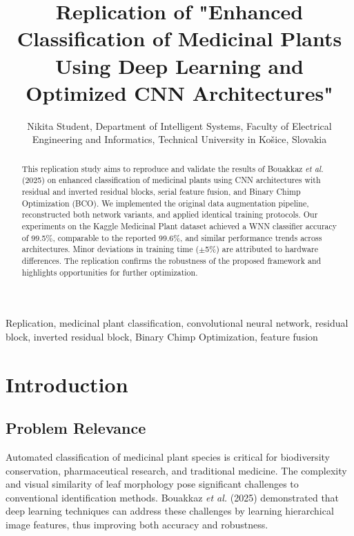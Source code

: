 \documentclass[journal,onecolumn]{IEEEtran}
\begin{document}
\title{Replication of "Enhanced Classification of Medicinal Plants Using Deep Learning and Optimized CNN Architectures"}

\author{Nikita Student, Department of Intelligent Systems, Faculty of Electrical Engineering and Informatics, Technical University in Košice, Slovakia}

\maketitle

\begin{abstract}
    This replication study aims to reproduce and validate the results of Bouakkaz \textit{et al.} (2025) on enhanced classification of medicinal plants using CNN architectures with residual and inverted residual blocks, serial feature fusion, and Binary Chimp Optimization (BCO). We implemented the original data augmentation pipeline, reconstructed both network variants, and applied identical training protocols. Our experiments on the Kaggle Medicinal Plant dataset achieved a WNN classifier accuracy of 99.5\%, comparable to the reported 99.6\%, and similar performance trends across architectures. Minor deviations in training time (\ensuremath{\pm}5\%) are attributed to hardware differences. The replication confirms the robustness of the proposed framework and highlights opportunities for further optimization.
    \end{abstract}
    
\begin{IEEEkeywords}
Replication, medicinal plant classification, convolutional neural network, residual block, inverted residual block, Binary Chimp Optimization, feature fusion
\end{IEEEkeywords}


\section{Introduction}
\subsection{Problem Relevance}
Automated classification of medicinal plant species is critical for biodiversity conservation, pharmaceutical research, and traditional medicine. The complexity and visual similarity of leaf morphology pose significant challenges to conventional identification methods. Bouakkaz \textit{et al.} (2025) demonstrated that deep learning techniques can address these challenges by learning hierarchical image features, thus improving both accuracy and robustness.
\end{document}
